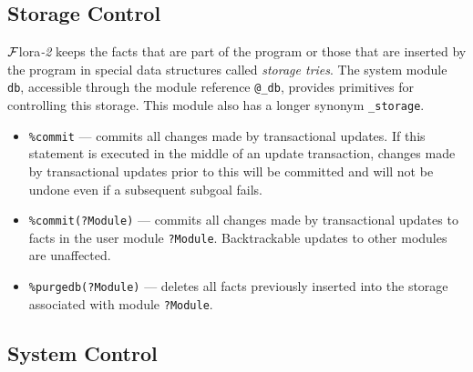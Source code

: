 \documentclass[11pt]{article}
\newcommand{\FLORA}{{\mbox{\sc ${\cal F}${lora}\rm\emph{-2}}}\xspace}
\begin{document}
\subsection{Storage Control}\label{sec:storage-ctl}

\FLORA keeps the facts that are part of the program or those that are
inserted by the program in special data structures called \emph{storage
  tries}.  The system module {\tt db}, accessible through the module
reference {\tt @\_db}, provides primitives for controlling this
storage. This module also has a longer synonym {\tt \_storage}. 
\begin{itemize}
  \item  {\tt \verb|%|commit} --- commits all changes made by transactional updates.
    If this statement is executed in the middle of an update transaction,
    changes made by transactional updates prior to this will be committed
    and will not be undone even if a subsequent subgoal fails.
  \item {\tt \verb|%|commit(?Module)} --- commits all changes made by transactional
    updates to facts in the user module {\tt ?Module}. Backtrackable updates
    to other modules are unaffected.
  \item {\tt \verb|%|purgedb(?Module)} --- deletes all facts previously inserted
    into the storage associated with module {\tt ?Module}.
\end{itemize}

\subsection{System Control}\label{sec-flora-syscontrol}
\end{document}
